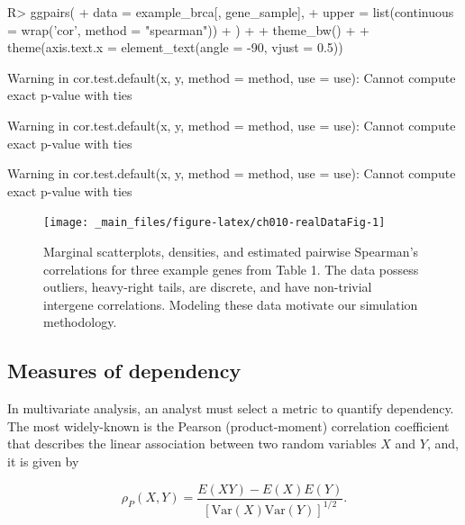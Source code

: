 \documentclass[
]{jss}
\begin{document}
\begin{CodeChunk}
\begin{CodeInput}
R> ggpairs(
+   data = example_brca[, gene_sample],
+   upper = list(continuous = wrap('cor', method = "spearman"))
+ ) + 
+   theme_bw() +
+   theme(axis.text.x = element_text(angle = -90, vjust = 0.5))
\end{CodeInput}
\begin{CodeOutput}
Warning in cor.test.default(x, y, method = method, use = use): Cannot compute
exact p-value with ties
\end{CodeOutput}
\begin{CodeOutput}
Warning in cor.test.default(x, y, method = method, use = use): Cannot compute
exact p-value with ties
\end{CodeOutput}
\begin{CodeOutput}
Warning in cor.test.default(x, y, method = method, use = use): Cannot compute
exact p-value with ties
\end{CodeOutput}
\begin{figure}

{\centering \texttt{[image: \_main\_files/figure-latex/ch010-realDataFig-1]} 

}

\caption[Marginal scatterplots, densities, and estimated pairwise Spearman's correlations for three example genes from Table 1]{Marginal scatterplots, densities, and estimated pairwise Spearman's correlations for three example genes from Table 1. The data possess outliers, heavy-right tails, are discrete, and have non-trivial intergene correlations. Modeling these data motivate our simulation methodology.}\label{fig:ch010-realDataFig}
\end{figure}
\end{CodeChunk}

\hypertarget{measures-of-dependency}{%
\subsection{Measures of dependency}\label{measures-of-dependency}}

In multivariate analysis, an analyst must select a metric to quantify dependency.
The most widely-known is the Pearson (product-moment) correlation coefficient that describes the linear association between two random variables \(X\) and \(Y\), and, it is given by

\begin{equation}
\rho_P(X,Y) = \frac{E(XY) - E(X)E(Y)}{\left[ \mathrm{Var}(X)\mathrm{Var}(Y)\right]^{1/2}}.
\label{eq:pearson}
\end{equation}
\end{document}

